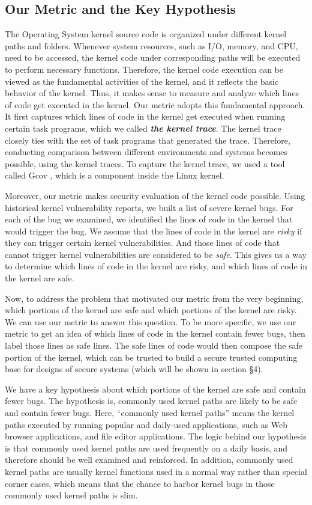 \subsection{Our Metric and the Key Hypothesis}
The Operating System kernel source code is organized under different kernel paths and folders. 
Whenever system resources, such as I/O, memory, and CPU, need to be accessed, the kernel code 
under corresponding paths will be executed to perform necessary functions. Therefore, the kernel code 
execution can be viewed as the fundamental activities of the kernel, and it reflects the basic behavior of 
the kernel. Thus, it makes sense to measure and analyze which lines of code get executed in the kernel. 
Our metric adopts this fundamental approach. It first captures which lines of code in the kernel get executed 
when running certain task programs, which we called \textbf{\textit{the kernel trace}}. The kernel trace closely
ties with the set of task programs that generated the trace. Therefore, conducting comparison between 
different environments and systems becomes possible, using the kernel traces. To capture the kernel trace, 
we used a tool called Gcov , which is a component inside the Linux kernel.

Moreover, our metric makes security evaluation of the kernel code possible. Using historical kernel vulnerability 
reports, we built a list of severe kernel bugs. For each of the bug we examined, we identified the lines of code 
in the kernel that would trigger the bug. We assume that the lines of code in the kernel are \textit{risky} if they 
can trigger certain kernel vulnerabilities. And those lines of code that cannot trigger kernel vulnerabilities are 
considered to be \textit{safe}. This gives us a way to determine which lines of code in the kernel are risky, and 
which lines of code in the kernel are safe.  

Now, to address the problem that motivated our metric from the very beginning, which portions of the kernel 
are safe and which portions of the kernel are risky. We can use our metric to answer this question. To be more
specific, we use our metric to get an idea of which lines of code in the kernel contain fewer bugs, then label 
those lines as safe lines. The safe lines of code would then compose the safe portion of the kernel, which can 
be trusted to build a secure trusted computing base for designs of secure systems (which will be shown in 
section \S 4). 

We have a key hypothesis about which portions of the kernel are safe and contain fewer bugs. The hypothesis 
is, commonly used kernel paths are likely to be safe and contain fewer bugs. Here, ``commonly used kernel paths'' 
means the kernel paths executed by running popular and daily-used applications, such as Web browser applications, 
and file editor applications. The logic behind our hypothesis is that commonly used kernel paths are used frequently 
on a daily basis, and therefore should be well examined and reinforced. In addition, commonly used kernel paths 
are usually kernel functions used in a normal way rather than special corner cases, which means that the chance 
to harbor kernel bugs in those commonly used kernel paths is slim. 


